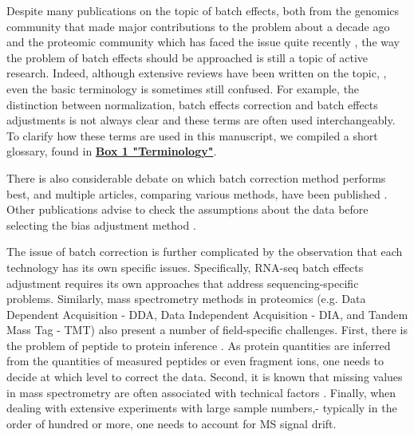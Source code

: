 \documentclass[num-refs]{wiley-article}
\begin{document}
Despite many publications on the topic of batch effects, both from the genomics community that made major contributions to the problem about a decade ago \cite{Leek:2010aa, Lazar:2013aa, Luo2010, Chen:2011ac, Dillies:2013aa, Chawade:2014aa} and the proteomic community which has faced the issue quite recently \cite{Karpievitch2012, Chawade:2014aa, Valikangas2018, Gregori2012}, the way the problem of batch effects should be approached is still a topic of active research. Indeed, although extensive reviews have been written on the topic, \cite{Lazar:2013aa, Leek:2010aa}, even the basic terminology is sometimes still confused. For example, the distinction between normalization, batch effects correction and batch effects adjustments is not always clear and these terms are often used interchangeably. To clarify how these terms are used in this manuscript, we compiled a short glossary, found in \textbf{\hyperref[box:Box1_definitions]{Box 1 "Terminology"}}. 

There is also considerable debate on which batch correction method performs best, and multiple articles, comparing various methods, have been published \cite{Luo2010, Chen:2011ac, Chawade:2014aa}. Other publications advise to check the assumptions about the data before selecting the bias adjustment method \cite{Evans:2018aa, GOH2017498}. 

The issue of batch correction is further complicated by the observation that each technology has its own specific issues. Specifically, RNA-seq batch effects adjustment requires its own approaches\cite{Dillies:2013aa} that address sequencing-specific problems. Similarly, mass spectrometry methods in proteomics (e.g. Data Dependent Acquisition - DDA, Data Independent Acquisition - DIA, and Tandem Mass Tag - TMT) also present a number of field-specific challenges. First, there is the problem of peptide to protein inference \cite{Clough:2012aa, Teo:2015aa, Rosenberger2014a, Choi2014, Muntel:2019aa}. As protein quantities are inferred from the quantities of measured peptides or even fragment ions, one needs to decide at which level to correct the data. Second, it is known that missing values in mass spectrometry are often associated with technical factors \cite{Karpievitch2012, Matafora2017}. Finally, when dealing with extensive experiments with large sample numbers,- typically in the order of hundred or more, one needs to account for MS signal drift. 
\end{document}
